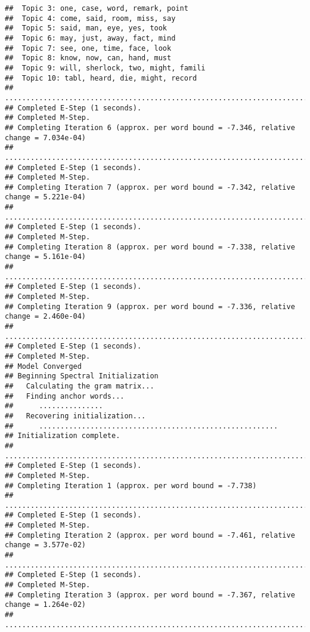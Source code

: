 \documentclass[
]{book}
\begin{document}
\begin{verbatim}
##  Topic 3: one, case, word, remark, point 
##  Topic 4: come, said, room, miss, say 
##  Topic 5: said, man, eye, yes, took 
##  Topic 6: may, just, away, fact, mind 
##  Topic 7: see, one, time, face, look 
##  Topic 8: know, now, can, hand, must 
##  Topic 9: will, sherlock, two, might, famili 
##  Topic 10: tabl, heard, die, might, record 
## ....................................................................................................
## Completed E-Step (1 seconds). 
## Completed M-Step. 
## Completing Iteration 6 (approx. per word bound = -7.346, relative change = 7.034e-04) 
## ....................................................................................................
## Completed E-Step (1 seconds). 
## Completed M-Step. 
## Completing Iteration 7 (approx. per word bound = -7.342, relative change = 5.221e-04) 
## ....................................................................................................
## Completed E-Step (1 seconds). 
## Completed M-Step. 
## Completing Iteration 8 (approx. per word bound = -7.338, relative change = 5.161e-04) 
## ....................................................................................................
## Completed E-Step (1 seconds). 
## Completed M-Step. 
## Completing Iteration 9 (approx. per word bound = -7.336, relative change = 2.460e-04) 
## ....................................................................................................
## Completed E-Step (1 seconds). 
## Completed M-Step. 
## Model Converged 
## Beginning Spectral Initialization 
##   Calculating the gram matrix...
##   Finding anchor words...
##      ...............
##   Recovering initialization...
##      ........................................................
## Initialization complete.
## ....................................................................................................
## Completed E-Step (1 seconds). 
## Completed M-Step. 
## Completing Iteration 1 (approx. per word bound = -7.738) 
## ....................................................................................................
## Completed E-Step (1 seconds). 
## Completed M-Step. 
## Completing Iteration 2 (approx. per word bound = -7.461, relative change = 3.577e-02) 
## ....................................................................................................
## Completed E-Step (1 seconds). 
## Completed M-Step. 
## Completing Iteration 3 (approx. per word bound = -7.367, relative change = 1.264e-02) 
## ....................................................................................................

\end{verbatim}
\end{document}
